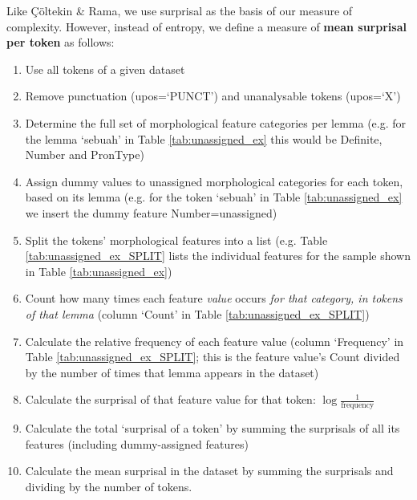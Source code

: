 \documentclass[USenglish]{article}
\begin{document}
Like Çöltekin \& Rama, we use surprisal as the basis of our measure of complexity.
However, instead of entropy, we define a measure of \textbf{mean surprisal per token} as follows:
\begin{enumerate}
\item Use all tokens of a given dataset
\item Remove punctuation (upos=`PUNCT') and unanalysable tokens (upos=`X')
\item Determine the full set of morphological feature categories per lemma (e.g. for the lemma `sebuah' in Table \ref{tab:unassigned_ex} this would be Definite, Number and PronType)
\item Assign dummy values to unassigned morphological categories for each token, based on its lemma (e.g. for the token `sebuah' in Table \ref{tab:unassigned_ex} we insert the dummy feature Number=unassigned)
\item Split the tokens' morphological features into a list (e.g. Table \ref{tab:unassigned_ex_SPLIT} lists the individual features for the sample shown in Table \ref{tab:unassigned_ex})
\item Count how many times each feature \textit{value} occurs \textit{for that category, in tokens of that lemma} (column `Count' in Table \ref{tab:unassigned_ex_SPLIT})
\item Calculate the relative frequency of each feature value (column `Frequency' in Table \ref{tab:unassigned_ex_SPLIT}; this is the feature value's Count divided by the number of times that lemma appears in the dataset)
\item Calculate the surprisal of that feature value for that token: $\log{\frac{1}{\text{frequency}}}$
\item Calculate the total `surprisal of a token' by summing the surprisals of all its features (including dummy-assigned features)
\item Calculate the mean surprisal in the dataset by summing the surprisals and dividing by the number of tokens.
\end{enumerate}
\end{document}
